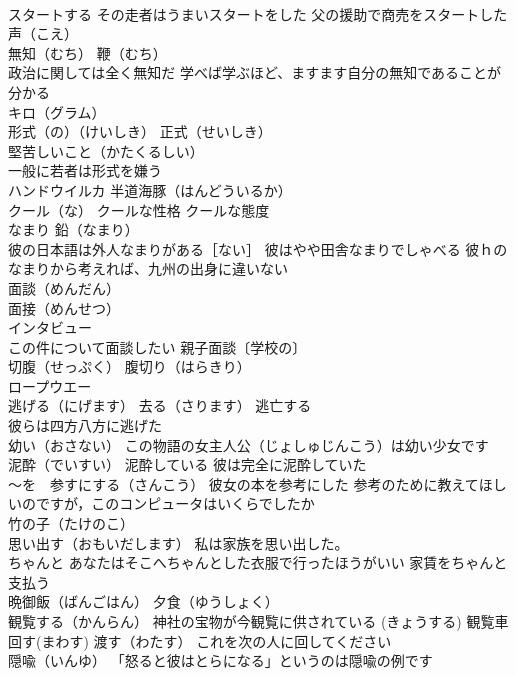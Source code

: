 \documentclass[8pt]{extreport}
\begin{document}
\begin{CJK}{UTF8}{min}
\\	スタートする その走者はうまいスタートをした 父の援助で商売をスタートした
\\	声（こえ）
\\	無知（むち） 鞭（むち） 
\\	政治に関しては全く無知だ 学べば学ぶほど、ますます自分の無知であることが分かる
\\	キロ（グラム）
\\	形式（の）（けいしき） 正式（せいしき）
\\	堅苦しいこと（かたくるしい）
\\	一般に若者は形式を嫌う
\\	ハンドウイルカ 半道海豚（はんどういるか）
\\	クール（な） クールな性格 クールな態度
\\	なまり 鉛（なまり）
\\	彼の日本語は外人なまりがある［ない］ 彼はやや田舎なまりでしゃべる 彼ｈのなまりから考えれば、九州の出身に違いない
\\	面談（めんだん） 
\\	面接（めんせつ） 
\\	インタビュー 
\\	この件について面談したい 親子面談〔学校の〕
\\	切腹（せっぷく） 腹切り（はらきり）
\\	ロープウエー
\\	逃げる（にげます） 去る（さります） 逃亡する　
\\	彼らは四方八方に逃げた
\\	幼い（おさない） この物語の女主人公（じょしゅじんこう）は幼い少女です
\\	泥酔（でいすい） 泥酔している 彼は完全に泥酔していた
\\	～を　参すにする（さんこう） 彼女の本を参考にした 参考のために教えてほしいのですが，このコンピュータはいくらでしたか
\\	竹の子（たけのこ）
\\	思い出す（おもいだします） 私は家族を思い出した。
\\	ちゃんと あなたはそこへちゃんとした衣服で行ったほうがいい 家賃をちゃんと支払う
\\	晩御飯（ばんごはん） 夕食（ゆうしょく）
\\	観覧する（かんらん） 神社の宝物が今観覧に供されている (きょうする) 観覧車
\\	回す(まわす) 渡す（わたす） これを次の人に回してください
\\	隠喩（いんゆ） 「怒ると彼はとらになる」というのは隠喩の例です

\end{CJK}
\end{document}
